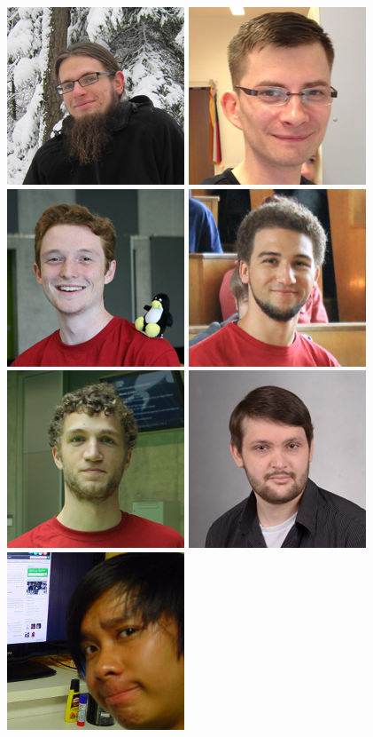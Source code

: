 \includegraphics[width=.2\linewidth]{img/fsr/200_jakob_kruse.jpg}
\includegraphics[width=.2\linewidth]{img/fsr/200_robin_trauer.jpg}
\includegraphics[width=.2\linewidth]{img/fsr/200_kilian_koeltzsch.jpg}
\includegraphics[width=.2\linewidth]{img/fsr/200_philipp_heisig.jpg}
\includegraphics[width=.2\linewidth]{img/fsr/200_simon_hanisch.jpg}
\includegraphics[width=.2\linewidth]{img/fsr/200_tim_hackel.jpg}
\includegraphics[width=.2\linewidth]{img/fsr/200_duc_nguyen_tien.jpg}
